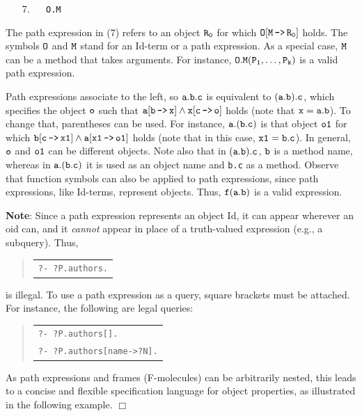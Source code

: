 \documentclass[11pt]{article}
\newenvironment{qrules}{\begin{quote}\tt\begin{tabular}[t]{l}}%
{\end{tabular}\end{quote}}
\newcommand{\mvd}{{\mbox{\tt \,->\,}}}  %
\begin{document}
  \medskip

\begin{enumerate} 
\item[7.]\label{eq-path-fun} ~~ {\tt O.M}
\end{enumerate} \medskip

\noindent
The path expression in (7) refers to an object $\tt R_0$ for which $\tt
O[M\mvd R_0]$ holds.  The symbols $\tt O$ and $\tt M$ stand for an Id-term
or a path expression.  As a special case, $\tt M$ can be a method that
takes arguments. For instance, $\tt O.M(P_1,\dots,P_k)$ is a valid path
expression.
  
Path expressions
associate to the left, so $\tt a.b.c$ is equivalent to $\tt (a.b).c$, which
specifies the object $\tt o$ such that $\tt a[b\mvd x] \land x[c\mvd o]$
holds (note that $\tt x=a.b$).
To change that, parentheses can be used. For instance, 
$\tt a.(b.c)$ is that object
$\tt o1$ for which $\tt b[c\mvd x1] \land a[x1\mvd o1]$ holds (note that in this
case, $\tt x1=b.c$). In general, $\tt o$ and $\tt o1$ can be different objects.
Note also that in $\tt (a.b).c$, $\tt b$ is a method name, whereas in $\tt
a.(b.c)$ it is used as an object name and {\tt b.c} as a method.  Observe
that function symbols can also be applied to path expressions, since path
expressions, like Id-terms, represent objects. Thus, $\tt f(a.b)$
is a valid expression.

\noindent
{\bf Note}: Since a path expression represents an object Id,
it can appear wherever an oid can, and it \emph{cannot} appear in
place of a truth-valued expression (e.g., a subquery).
Thus,
\begin{qrules}
\tt ?- ?P.authors.
\end{qrules}
is illegal. To use a path expression as a
query, square brackets must be attached. For instance, the following are
legal queries:
\begin{qrules}
   \tt ?- ?P.authors[]. \\
   \tt ?- ?P.authors[name->?N].
\end{qrules}
\noindent
As path expressions and frames (F-molecules) can be arbitrarily nested, this leads
to a concise and flexible specification language for object properties, as
illustrated in the following example.
   \hfill$\Box$
\end{document}
